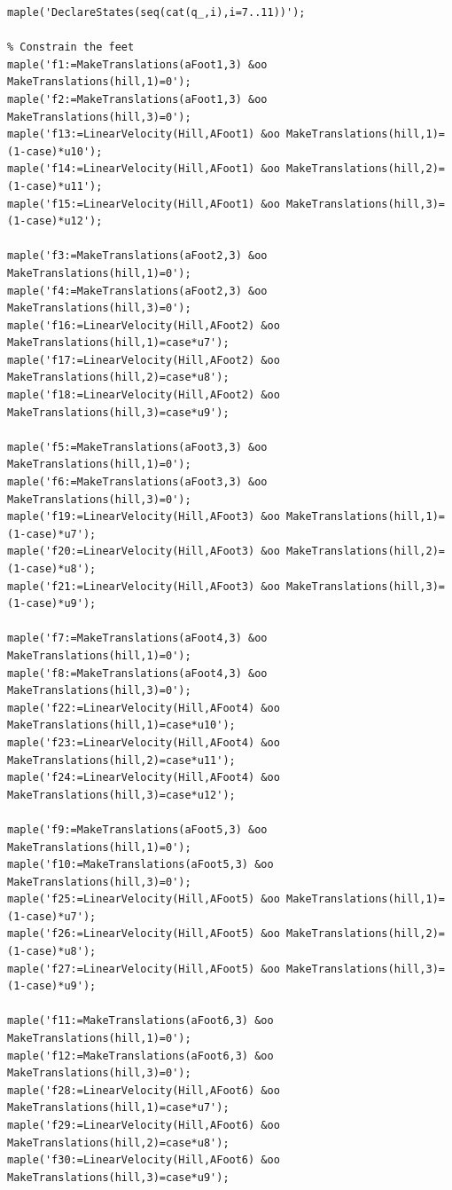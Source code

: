 \documentclass{article}
\begin{document}
\begin{verbatim}
maple('DeclareStates(seq(cat(q_,i),i=7..11))');

% Constrain the feet
maple('f1:=MakeTranslations(aFoot1,3) &oo MakeTranslations(hill,1)=0');
maple('f2:=MakeTranslations(aFoot1,3) &oo MakeTranslations(hill,3)=0');
maple('f13:=LinearVelocity(Hill,AFoot1) &oo MakeTranslations(hill,1)=(1-case)*u10');
maple('f14:=LinearVelocity(Hill,AFoot1) &oo MakeTranslations(hill,2)=(1-case)*u11');
maple('f15:=LinearVelocity(Hill,AFoot1) &oo MakeTranslations(hill,3)=(1-case)*u12');

maple('f3:=MakeTranslations(aFoot2,3) &oo MakeTranslations(hill,1)=0');
maple('f4:=MakeTranslations(aFoot2,3) &oo MakeTranslations(hill,3)=0');
maple('f16:=LinearVelocity(Hill,AFoot2) &oo MakeTranslations(hill,1)=case*u7');
maple('f17:=LinearVelocity(Hill,AFoot2) &oo MakeTranslations(hill,2)=case*u8');
maple('f18:=LinearVelocity(Hill,AFoot2) &oo MakeTranslations(hill,3)=case*u9');

maple('f5:=MakeTranslations(aFoot3,3) &oo MakeTranslations(hill,1)=0');
maple('f6:=MakeTranslations(aFoot3,3) &oo MakeTranslations(hill,3)=0');
maple('f19:=LinearVelocity(Hill,AFoot3) &oo MakeTranslations(hill,1)=(1-case)*u7');
maple('f20:=LinearVelocity(Hill,AFoot3) &oo MakeTranslations(hill,2)=(1-case)*u8');
maple('f21:=LinearVelocity(Hill,AFoot3) &oo MakeTranslations(hill,3)=(1-case)*u9');

maple('f7:=MakeTranslations(aFoot4,3) &oo MakeTranslations(hill,1)=0');
maple('f8:=MakeTranslations(aFoot4,3) &oo MakeTranslations(hill,3)=0');
maple('f22:=LinearVelocity(Hill,AFoot4) &oo MakeTranslations(hill,1)=case*u10');
maple('f23:=LinearVelocity(Hill,AFoot4) &oo MakeTranslations(hill,2)=case*u11');
maple('f24:=LinearVelocity(Hill,AFoot4) &oo MakeTranslations(hill,3)=case*u12');

maple('f9:=MakeTranslations(aFoot5,3) &oo MakeTranslations(hill,1)=0');
maple('f10:=MakeTranslations(aFoot5,3) &oo MakeTranslations(hill,3)=0');
maple('f25:=LinearVelocity(Hill,AFoot5) &oo MakeTranslations(hill,1)=(1-case)*u7');
maple('f26:=LinearVelocity(Hill,AFoot5) &oo MakeTranslations(hill,2)=(1-case)*u8');
maple('f27:=LinearVelocity(Hill,AFoot5) &oo MakeTranslations(hill,3)=(1-case)*u9');

maple('f11:=MakeTranslations(aFoot6,3) &oo MakeTranslations(hill,1)=0');
maple('f12:=MakeTranslations(aFoot6,3) &oo MakeTranslations(hill,3)=0');
maple('f28:=LinearVelocity(Hill,AFoot6) &oo MakeTranslations(hill,1)=case*u7');
maple('f29:=LinearVelocity(Hill,AFoot6) &oo MakeTranslations(hill,2)=case*u8');
maple('f30:=LinearVelocity(Hill,AFoot6) &oo MakeTranslations(hill,3)=case*u9');


\end{verbatim}
\end{document}
